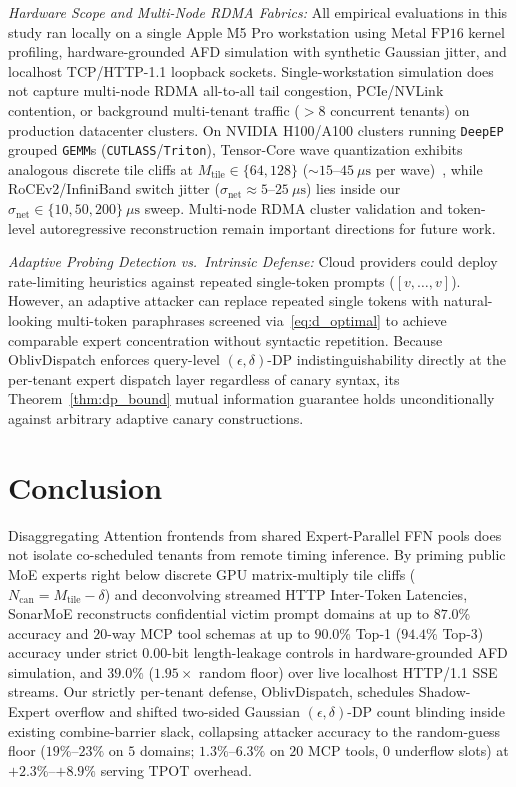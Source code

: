 \documentclass[final,5p,times,twocolumn]{elsarticle}
\def\SM{SonarMoE}%
\def\OD{OblivDispatch}%
\theoremstyle{definition}
\theoremstyle{remark}
\newcommand{\SM}{\textsc{SonarMoE}}
\newcommand{\OD}{\textsc{OblivDispatch}}
\begin{document}
\emph{Hardware Scope and Multi-Node RDMA Fabrics:} All empirical evaluations in this study ran locally on a single Apple M5 Pro workstation using Metal $\mathrm{FP16}$ kernel profiling, hardware-grounded AFD simulation with synthetic Gaussian jitter, and localhost TCP/HTTP-1.1 loopback sockets. Single-workstation simulation does not capture multi-node RDMA all-to-all tail congestion, PCIe/NVLink contention, or background multi-tenant traffic ($>8$ concurrent tenants) on production datacenter clusters. On NVIDIA H100/A100 clusters running \texttt{DeepEP}~\cite{zhao2025deepep} grouped \texttt{GEMM}s (\texttt{CUTLASS}/\texttt{Triton}), Tensor-Core wave quantization exhibits analogous discrete tile cliffs at $M_{\mathrm{tile}} \in \{64, 128\}$ ($\sim 15$--$45~\mu\mathrm{s}$ per wave)~\cite{tan2025gpugemmcliff}, while RoCEv2/InfiniBand switch jitter ($\sigma_{\mathrm{net}} \approx 5$--$25~\mu\mathrm{s}$) lies inside our $\sigma_{\mathrm{net}} \in \{10, 50, 200\}~\mu\mathrm{s}$ sweep. Multi-node RDMA cluster validation and token-level autoregressive reconstruction remain important directions for future work.

\emph{Adaptive Probing Detection vs.\ Intrinsic Defense:} Cloud providers could deploy rate-limiting heuristics against repeated single-token prompts ($[v, \dots, v]$). However, an adaptive attacker can replace repeated single tokens with natural-looking multi-token paraphrases screened via~\eqref{eq:d_optimal} to achieve comparable expert concentration without syntactic repetition. Because \OD{} enforces query-level $(\epsilon, \delta)$-DP indistinguishability directly at the per-tenant expert dispatch layer regardless of canary syntax, its Theorem~\ref{thm:dp_bound} mutual information guarantee holds unconditionally against arbitrary adaptive canary constructions.

\section{Conclusion}\label{sec:conclusion}

Disaggregating Attention frontends from shared Expert-Parallel FFN pools does not isolate co-scheduled tenants from remote timing inference. By priming public MoE experts right below discrete GPU matrix-multiply tile cliffs ($N_{\mathrm{can}} = M_{\mathrm{tile}} - \delta$) and deconvolving streamed HTTP Inter-Token Latencies, \SM{} reconstructs confidential victim prompt domains at up to $87.0\%$ accuracy and $20$-way MCP tool schemas at up to $90.0\%$ Top-1 ($94.4\%$ Top-3) accuracy under strict $0.00$-bit length-leakage controls in hardware-grounded AFD simulation, and $39.0\%$ ($1.95\times$ random floor) over live localhost HTTP/1.1 SSE streams. Our strictly per-tenant defense, \OD{}, schedules Shadow-Expert overflow and shifted two-sided Gaussian $(\epsilon, \delta)$-DP count blinding inside existing combine-barrier slack, collapsing attacker accuracy to the random-guess floor ($19\%$--$23\%$ on $5$ domains; $1.3\%$--$6.3\%$ on $20$ MCP tools, $0$ underflow slots) at $+2.3\%$--$+8.9\%$ serving $\mathrm{TPOT}$ overhead.
\end{document}
